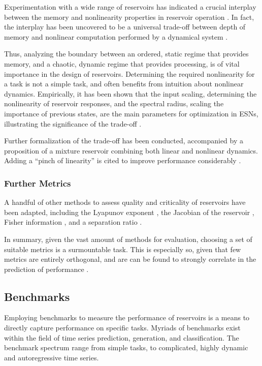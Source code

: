Experimentation with a wide range of reservoirs has indicated a crucial
interplay between the memory and nonlinearity properties in reservoir operation
\cite{verstraeten_memory_2010}. In fact, the interplay has been uncovered to be
a universal trade-off between depth of memory and nonlinear computation
performed by a dynamical system \cite{dambre_information_2012}.

Thus, analyzing the boundary between an ordered, static regime that provides
memory, and a chaotic, dynamic regime that provides processing, is of vital
importance in the design of reservoirs. Determining the required nonlinearity
for a task is not a simple task, and often benefits from intuition about
nonlinear dynamics. Empirically, it has been shown that the input scaling,
determining the nonlinearity of reservoir responses, and the spectral radius,
scaling the importance of previous states, are the main parameters for
optimization in ESNs, illustrating the significance of the trade-off
\cite{montavon_practical_2012}.

Further formalization of the trade-off has been conducted, accompanied by a
proposition of a mixture reservoir combining both linear and nonlinear
dynamics. Adding a ``pinch of linearity'' is cited to improve performance
considerably \cite{inubushi_reservoir_2017}.

\subsubsection{Further Metrics}

A handful of other methods to assess quality and criticality of reservoirs have
been adapted, including the Lyapunov exponent
\cite{verstraeten_experimental_2007}, the Jacobian of the reservoir
\cite{alippi_quantification_2009}, Fisher information
\cite{livi_determination_2018}, and a separation ratio
\cite{gibbons_unifying_2010}.

In summary, given the vast amount of methods for evaluation, choosing a set of
suitable metrics is a surmountable task. This is especially so, given that few
metrics are entirely orthogonal, and are can be found to strongly correlate in
the prediction of performance \cite{chrol-cannon_correlation_2014}.

\subsection{Benchmarks}

Employing benchmarks to measure the performance of reservoirs is a means to
directly capture performance on specific tasks. Myriads of benchmarks exist
within the field of time series prediction, generation, and classification. The
benchmark spectrum range from simple tasks, to complicated, highly dynamic and
autoregressive time series.

